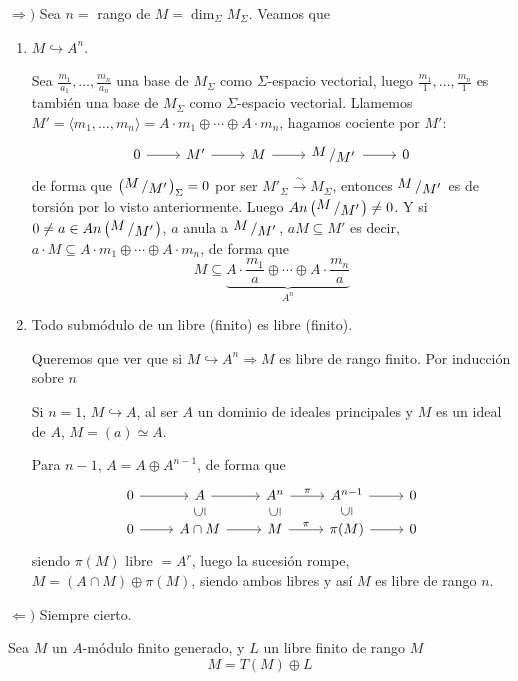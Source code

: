 \begin{dem}
    $\Rightarrow)$ Sea $n=$ rango de $M = \dim_{\Sigma} M_{\Sigma}$. Veamos que
    \begin{enumerate}[1)]
        \item $M \hookrightarrow A^n$. 

        Sea $\frac{m_1}{a_1}, \ldots, \frac{m_n}{a_n}$ una base de $M_{\Sigma}$ como $\Sigma$-espacio vectorial, luego $\frac{m_1}{1}, \ldots, \frac{m_n}{1}$ es tambi\'en una base de $M_{\Sigma}$ como $\Sigma$-espacio vectorial. Llamemos $M' = \langle m_1, \ldots, m_n\rangle = A\cdot m_1 \oplus \cdots \oplus A\cdot m_n$, hagamos cociente por $M'$:
        $$\bt 0\rar & M' \rar & \rar M & \modulo{M}{M'} \rar & 0 \et$$
        de forma que $\left(\modulo{M}{M'} \right)_{\Sigma} = 0$ por ser $M'_{\Sigma} \overset{\sim}{\longrightarrow} M_{\Sigma}$, entonces $\modulo{M}{M'}$ es de torsi\'on por lo visto anteriormente. Luego $An \left(\modulo{M}{M'}\right) \neq 0$. Y si $0 \neq a \in An\left(\modulo{M}{M'}\right)$, $a$ anula a $\modulo{M}{M'}$, $aM\subseteq M'$ es decir, $a\cdot M \subseteq  A\cdot m_1 \oplus \cdots \oplus A\cdot m_n$, de forma que 
        $$M \subseteq  \underbrace{A\cdot \frac{m_1}{a} \oplus \cdots \oplus A\cdot \frac{m_n}{a}}_{A^n}$$ 

        \item Todo subm\'odulo de un libre (finito) es libre (finito).

        Queremos que ver que si $M \hookrightarrow A^n \Rightarrow M$ es libre de rango finito. Por inducci\'on sobre $n$

        Si $n =1$, $M \hookrightarrow A$, al ser $A$ un dominio de ideales principales y $M$ es un ideal de $A$, $M=(a) \simeq A$.

        Para $n-1$, $A = A \oplus A^{n-1}$, de forma que 
        $$\bt 0 \rar &  A \rar & A^n \rar{\pi} & A^{n-1} \rar & 0 \\[-3mm]
        0 \rar & A\cap M \arrow[u, phantom, "{\rotatebox{90}{$\subseteq$}}"] \rar & M \rar{\pi} \arrow[u, phantom, "{\rotatebox{90}{$\subseteq$}}"] & \pi(M) \arrow[u, phantom, "{\rotatebox{90}{$\subseteq$}}"] \rar & 0
        \et$$
        siendo $\pi(M)$ libre $=A^r$, luego la sucesi\'on rompe, $M = (A\cap M) \oplus \pi(M)$, siendo ambos libres y as\'i $M$ es libre de rango $n$. 
    \end{enumerate}

    $\Leftarrow)$ Siempre cierto. 
\end{dem}
\begin{teo}
     Sea $M$ un $A$-m\'odulo finito generado, y $L$ un libre finito de rango $M$
    $$M = T(M) \oplus L$$
\end{teo}
